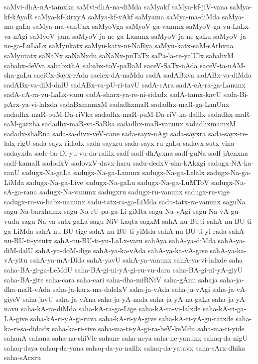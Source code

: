 {saMvi-dhA-nA-tamxka
saMvi-dhA-na-diMda
saMyakf
saMya-kf-jiV-vana
saMya-kf-kAyaR
saMya-kf-kirxyA
saMya-kf-vAkf
saMyama
saMya-ma-diMda
saMya-ma-gaLa
saMya-ma-vanUnx
saMyoVga
saMyoV-ga-vanunx
saMyoV-ga-vu-LaLx-va-nAgi
saMyoV-jana
saMyoV-ja-ne-ga-Lanunx
saMyoV-ja-ne-gaLu
saMyoV-ja-ne-ga-LuLaLx
saMyukatx
saMyu-katx-ni-NaRya
saMyu-katx-saM-sAthxna
saMyutatx
saNaNx
saNaNxdu
saNaNx-puTaTx
saPa-la-te-yalUlx
sababxM
sababx-deVva
sababxthA
sababx-toV-paBaM
saceV-SaTx-nAda
saceV-ta-nAM-sha-gaLu
saciCx-Sayx-rAda
sacicx-dA-naMda
sadA
sadABxva
sadABx-va-diMda
sadABx-va-diM-dalU
sadABx-va-pU-ri-tavU
sadA-cAra
sadA-cA-ra-ga-Lanunx
sadA-cA-ra-vu-LaLx-vanu
sadA-sharx-ya-re-ni-sidadx
sadA-tamx-kavU
sada-Bi-pArx-ya-vi-lalxda
sadaBxmamxM
sadadhxmaR
sadadhx-maR-ga-LanUnx
sadadhx-maR-puM-Da-riVka
sadadhx-maR-puM-Da-riV-ka-dalilx
sadadhx-maR-saM-garxha
sadadhx-maR-va-SaRka
sadadhx-maR-vanunx
sadadhxmamxM
sadadx-shaRna
sada-sa-divx-veV-cane
sada-sayx-nAgi
sada-sayxra
sada-sayx-re-lalx-rigU
sada-sayx-ridadx
sada-sayxru
sada-sayx-ru-gaLu
sadavx-sutx-vina
sadayxda
sade-ba-Di-yu-vu-da-ralilx
sadf
sadf-dhAyxna
sadf-guNa
sadf-jAcnxna
sadf-kamaR
sadodxV
sadovxV-davx-haru
sadu-dedxV-sha-kAkxgi
sadugx-NA-ka-ranU
sadugx-Na-gaLa
sadugx-Na-ga-Lanunx
sadugx-Na-ga-Lelalx
sadugx-Na-ga-LiMda
sadugx-Na-ga-Live
sadugx-Na-gaLu
sadugx-Na-ga-LuMToV
sadugx-Na-sA-ga-rana
sadugx-Na-vanunx
sadugxru
sadugx-ru-vanunx
sadugx-ru-vige
sadugx-ru-vo-babx-nanunx
sadu-tatx-ra-ga-LiMda
sadu-tatx-ra-vanunx
saguNa
sagu-Na-barxhamx
sagu-Na-rU-pa-ga-Li-giMta
sagu-Na-vAgi
sagu-Na-vA-gu-vudu
sagu-Na-va-sutx-gaLa
sagu-NiV-kaqta
sagxM
sahA-nu-BUti
sahA-nu-BU-ti-ga-LiMda
sahA-nu-BU-tige
sahA-nu-BU-ti-yiMda
sahA-nu-BU-ti-yi-rada
sahA-nu-BU-ti-yitutx
sahA-nu-BU-ti-yu-LaLx-varu
sahAya
sahA-ya-diMda
sahA-ya-diM-dalU
sahA-ya-doM-dige
sahA-ya-ka-vAda
sahA-ya-ka-vA-give
sahA-ya-ka-vA-yitu
sahA-ya-mA-Dida
sahA-yavU
sahA-ya-vanunx
sahA-ya-vi-lalxde
saha
saha-BA-gi-ga-LeMdU
saha-BA-gi-ni-yA-gi-ru-vu-dara
saha-BA-gi-ni-yA-giyU
saha-BA-gite
saha-cara
saha-cari
saha-dha-miRNiV
saha-gAmi
sahaja
saha-ja-dha-maR-vAda
saha-ja-karx-ma-dalelxV
saha-ja-vAda
saha-ja-vAgi
saha-ja-vA-giyeV
saha-javU
saha-ja-yAna
saha-ja-yA-nada
saha-ja-yA-na-gaLa
saha-ja-yA-navu
saha-kA-ra-diMda
saha-kA-ra-ga-Lige
saha-kA-ra-vi-lalxde
saha-kA-ri-ga-LA-give
saha-kA-ri-yA-gi-ruva
saha-kA-ri-yA-give
saha-kA-ri-yA-gu-tatxde
saha-ka-ri-sa-didadx
saha-ka-ri-sive
saha-ma-ti-yA-gi-ra-beV-keMdu
saha-ma-ti-yide
sahanA
sahana
saha-na-shiVle
sahane
saha-neya
saha-ne-yanunx
sahaq-da-nigU
sahaq-daya
sahaq-da-yana
sahaq-da-ya-nalilx
sahaq-da-yatavx
saha-sArx-dhika
saha-sArxru
}
